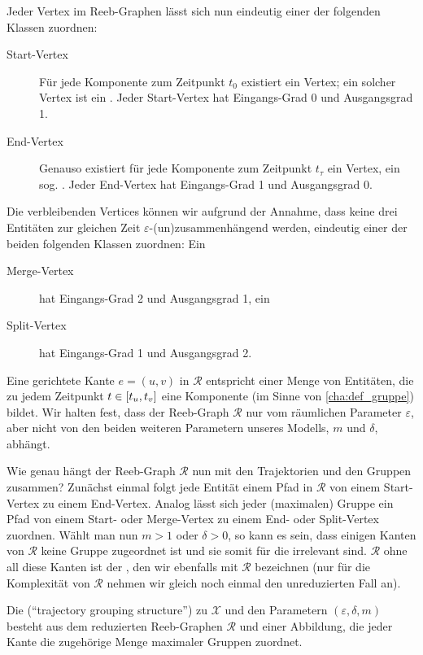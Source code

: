 Jeder Vertex im Reeb-Graphen lässt sich nun eindeutig einer der folgenden Klassen zuordnen:
\begin{description}
	\item[Start-Vertex] Für jede Komponente zum Zeitpunkt $t_0$ existiert ein Vertex; ein solcher Vertex ist ein .
	Jeder Start-Vertex hat Eingangs-Grad 0 und Ausgangsgrad 1.
	\item[End-Vertex] Genauso existiert für jede Komponente zum Zeitpunkt $t_\tau$ ein Vertex, ein sog. .
	Jeder End-Vertex hat Eingangs-Grad 1 und Ausgangsgrad 0.
\end{description}
Die verbleibenden Vertices können wir aufgrund der Annahme, dass keine drei Entitäten zur gleichen Zeit $\varepsilon$-(un)zusammenhängend werden, eindeutig einer der beiden folgenden Klassen zuordnen: Ein
\begin{description}
	\item[Merge-Vertex] hat Eingangs-Grad 2 und Ausgangsgrad 1, ein
	\item[Split-Vertex] hat Eingangs-Grad 1 und Ausgangsgrad 2.
\end{description}
Eine gerichtete Kante $e=(u,v)$ in $\mathcal{R}$ entspricht einer Menge von Entitäten, die zu jedem Zeitpunkt $t \in \benbrace*{t_u,t_v}$ eine Komponente (im Sinne von \cref{cha:def_gruppe}) bildet.
Wir halten fest, dass der Reeb-Graph $\mathcal{R}$ nur vom räumlichen Parameter $\varepsilon$, aber nicht von den beiden weiteren Parametern unseres Modells, $m$ und $\delta$, abhängt.

Wie genau hängt der Reeb-Graph $\mathcal{R}$ nun mit den Trajektorien und den Gruppen zusammen?
Zunächst einmal folgt jede Entität einem Pfad in $\mathcal{R}$ von einem Start-Vertex zu einem End-Vertex.
Analog lässt sich jeder (maximalen) Gruppe ein Pfad von einem Start- oder Merge-Vertex zu einem End- oder Split-Vertex zuordnen.
Wählt man nun $m > 1$ oder $\delta > 0$, so kann es sein, dass einigen Kanten von $\mathcal{R}$ keine Gruppe zugeordnet ist und sie somit für die \GrpStruktur irrelevant sind.
$\mathcal{R}$ ohne all diese Kanten ist der , den wir ebenfalls mit $\mathcal{R}$ bezeichnen (nur für die Komplexität von $\mathcal{R}$ nehmen wir gleich noch einmal den unreduzierten Fall an).


\begin{definition}[{name=[{\GrpStruktur}]},label=def:grpstrukur]
	Die \bet{\GrpStruktur} (\enquote{trajectory grouping structure}) zu $\mathcal{X}$ und den Parametern $(\varepsilon,\delta,m)$ besteht aus dem reduzierten Reeb-Graphen $\mathcal{R}$ und einer Abbildung, die jeder Kante die zugehörige Menge maximaler Gruppen zuordnet.
\end{definition}


